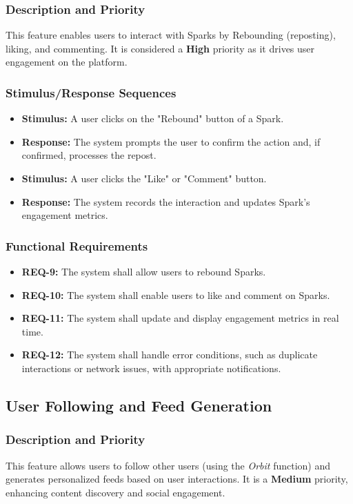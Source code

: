 \documentclass[a4paper,12pt]{article}
\begin{document}
\subsubsection{Description and Priority}
This feature enables users to interact with Sparks by Rebounding (reposting), liking, and commenting. It is considered a \textbf{High} priority as it drives user engagement on the platform.

\subsubsection{Stimulus/Response Sequences}
\begin{itemize}
    \item \textbf{Stimulus:} A user clicks on the "Rebound" button of a Spark.
    \item \textbf{Response:} The system prompts the user to confirm the action and, if confirmed, processes the repost.
    \item \textbf{Stimulus:} A user clicks the "Like" or "Comment" button.
    \item \textbf{Response:} The system records the interaction and updates Spark's engagement metrics.
\end{itemize}

\subsubsection{Functional Requirements}
\begin{itemize}
    \item \textbf{REQ-9:} The system shall allow users to rebound Sparks.
    \item \textbf{REQ-10:} The system shall enable users to like and comment on Sparks.
    \item \textbf{REQ-11:} The system shall update and display engagement metrics in real time.
    \item \textbf{REQ-12:} The system shall handle error conditions, such as duplicate interactions or network issues, with appropriate notifications.
\end{itemize}

\subsection{User Following and Feed Generation}
\subsubsection{Description and Priority}
This feature allows users to follow other users (using the \textit{Orbit} function) and generates personalized feeds based on user interactions. It is a \textbf{Medium} priority, enhancing content discovery and social engagement.
\end{document}
